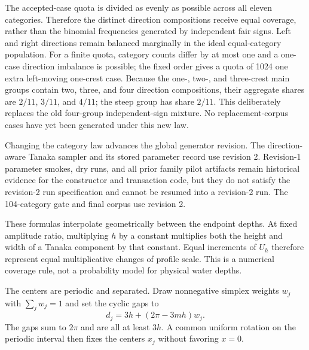\documentclass[10pt]{article}
\begin{document}
The accepted-case quota is divided as evenly as possible across all eleven
categories.  Therefore the distinct direction compositions receive equal
coverage, rather than the binomial frequencies generated by independent fair
signs.  Left and right directions remain balanced marginally in the ideal
equal-category population.  For a finite quota, category counts differ by at
most one and a one-case direction imbalance is possible; the fixed order gives
a quota of 1024 one extra left-moving one-crest case.  Because the one-, two-,
and three-crest main groups contain two, three, and four direction
compositions, their aggregate shares are $2/11$, $3/11$, and $4/11$; the
steep group has share $2/11$.  This deliberately replaces the old four-group
independent-sign mixture.  No replacement-corpus cases have yet been
generated under this new law.

Changing the category law advances the global generator revision.  The
direction-aware Tanaka sampler and its stored parameter record use revision 2.
Revision-1 parameter smokes, dry runs, and all prior family pilot artifacts
remain historical evidence for the constructor and transaction code, but they
do not satisfy the revision-2 run specification and cannot be resumed into a
revision-2 run.  The
104-category gate and final corpus use revision 2.

These formulas interpolate geometrically between the endpoint depths.  At
fixed amplitude ratio, multiplying $h$ by a constant multiplies both the
height and width of a Tanaka component by that constant.  Equal increments
of $U_h$ therefore represent equal multiplicative changes of profile scale.
This is a numerical coverage rule, not a probability model for physical
water depths.

The centers are periodic and separated.  Draw nonnegative simplex weights
$w_j$ with $\sum_jw_j=1$ and set the cyclic gaps to
\begin{equation}
  d_j=3h+(2\pi-3mh)w_j.
  \label{eq:tanaka-gaps}
\end{equation}
The gaps sum to $2\pi$ and are all at least $3h$.  A common uniform rotation
on the periodic interval then fixes the centers $x_j$ without favoring
$x=0$.
\end{document}
